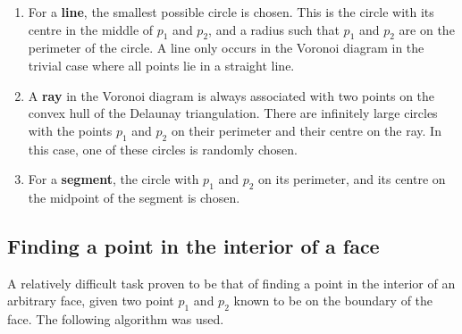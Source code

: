 \documentclass[a4paper,12pt]{article}
\begin{document}
\begin{enumerate}
\item
For a {\bf line}, the smallest possible circle is chosen. This is the circle with its centre in the middle of $p_1$ and $p_2$, and a radius such that $p_1$ and $p_2$ are on the perimeter of the circle. A line only occurs in the Voronoi diagram in the trivial case where all points lie in a straight line.
\item
A {\bf ray} in the Voronoi diagram is always associated with two points on the convex hull of the Delaunay triangulation. There are infinitely large circles with the points $p_1$ and $p_2$ on their perimeter and their centre on the ray. In this case, one of these circles is randomly chosen.
\item
For a {\bf segment}, the circle with $p_1$ and $p_2$ on its perimeter, and its centre on the midpoint of the segment is chosen.
\end{enumerate}

\subsection{Finding a point in the interior of a face}
\label{sec:findPoints}
A relatively difficult task proven to be that of finding a point in the interior of an arbitrary face, given two point $p_1$ and $p_2$ known to be on the boundary of the face. The following algorithm was used.
\end{document}

